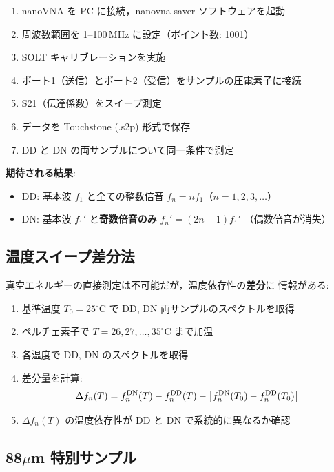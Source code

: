 \begin{enumerate}
\item nanoVNA を PC に接続，nanovna-saver ソフトウェアを起動
\item 周波数範囲を 1--100\,MHz に設定（ポイント数: 1001）
\item SOLT キャリブレーションを実施
\item ポート1（送信）とポート2（受信）をサンプルの圧電素子に接続
\item S21（伝達係数）をスイープ測定
\item データを Touchstone (.s2p) 形式で保存
\item DD と DN の両サンプルについて同一条件で測定
\end{enumerate}

\textbf{期待される結果}:
\begin{itemize}
\item DD: 基本波 $f_1$ と全ての整数倍音 $f_n = n f_1$（$n = 1, 2, 3, \ldots$）
\item DN: 基本波 $f_1'$ と\textbf{奇数倍音のみ} $f_n' = (2n-1) f_1'$
  （偶数倍音が消失）
\end{itemize}

\subsection{温度スイープ差分法}

真空エネルギーの直接測定は不可能だが，温度依存性の\textbf{差分}に
情報がある:

\begin{enumerate}
\item 基準温度 $T_0 = 25^\circ$C で DD, DN 両サンプルのスペクトルを取得
\item ペルチェ素子で $T = 26, 27, \ldots, 35^\circ$C まで加温
\item 各温度で DD, DN のスペクトルを取得
\item 差分量を計算:
\begin{equation}
\Delta f_n(T) = f_n^{\rm DN}(T) - f_n^{\rm DD}(T) - \left[f_n^{\rm DN}(T_0) - f_n^{\rm DD}(T_0)\right]
\end{equation}
\item $\Delta f_n(T)$ の温度依存性が DD と DN で系統的に異なるか確認
\end{enumerate}

\subsection{88$\mu$m 特別サンプル}

